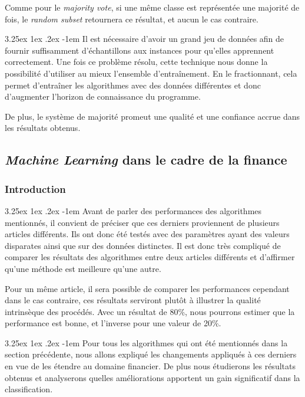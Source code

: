 \documentclass[a4paper, 11pt]{article}
\makeatletter
\renewcommand\paragraph{\@startsection{paragraph}{5}{\z@}%
  {3.25ex \@plus1ex \@minus.2ex}%
  {-1em}%
  {\normalfont\normalsize\bfseries}}
\makeatother
\begin{document}
Comme pour le \textit{majority vote}, si une même classe est représentée une majorité de fois, le \textit{random subset} retournera ce résultat, et aucun le cas contraire.

\paragraph{}
Il est nécessaire d'avoir un grand jeu de données afin de fournir suffisamment d'échantillons aux instances pour qu'elles apprennent correctement.
Une fois ce problème résolu, cette technique nous donne la possibilité d'utiliser au mieux l'ensemble d'entraînement. En le fractionnant, cela permet d'entraîner les algorithmes avec des données différentes et donc d'augmenter l'horizon de connaissance du programme.

De plus, le système de majorité promeut une qualité et une confiance accrue dans les résultats obtenus.


\subsection{\textit{Machine Learning} dans le cadre de la finance}\label{section machine learning finance}
\subsubsection{Introduction}
\paragraph{}
Avant de parler des performances des algorithmes mentionnés, il convient de préciser que ces derniers proviennent de plusieurs articles différents. Ils ont donc été testés avec des paramètres ayant des valeurs disparates ainsi que sur des données distinctes.
Il est donc très compliqué de comparer les résultats des algorithmes entre deux articles différents et d'affirmer qu'une méthode est meilleure qu'une autre. 

Pour un même article, il sera possible de comparer les performances  cependant dans le cas contraire, ces résultats serviront plutôt à illustrer la qualité intrinsèque des procédés. Avec un résultat de 80\%, nous pourrons estimer que la performance est bonne, et l'inverse pour une valeur de 20\%.

\paragraph{}
Pour tous les algorithmes qui ont été mentionnés dans la section précédente, nous allons expliqué les changements appliqués à ces derniers en vue de les étendre au domaine financier. De plus nous étudierons les résultats obtenus et analyserons quelles améliorations apportent un gain significatif dans la classification.
\end{document}
